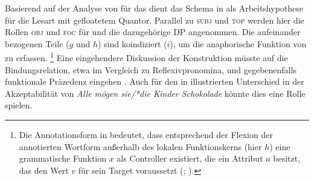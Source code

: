 Basierend auf der Analyse von \citet{spector2009} für das  dient das
Schema in  als Arbeits\-hypothese für die Lesart
mit gefloatetem Quantor. Parallel zu \textsc{subj} und \textsc{top} werden hier
die Rollen \textsc{obj} und \textsc{foc} für  und die dazugehörige
DP angenommen. Die aufeinander bezogenen Teile ($g$ und $h$) sind koindiziert
($i$), um die anaphorische Funktion von  zu erfassen.%
%
	\footnote{Die Annotationsform  in
		 bedeutet, dass entsprechend der Flexion der
		annotierten Wortform außerhalb des lokalen Funktionskerns (hier $h$)
		eine grammatische Funktion $x$ als Controller existiert, die ein
		Attribut $a$ besitzt, das den Wert $v$ für sein Target voraussetzt
		(;
		\cite[66--70]{bresnanetal2016}).}
%
Eine eingehendere Diskussion der Konstruktion müsste auf die Bindungsrelation,
etwa im Vergleich zu Reflexivpronomina, und gegebenenfalls funktionale
Präzedenz eingehen \autocite[vgl.][213, 254--285]{bresnanetal2016}. Auch für
den in  illustrierten Unterschied in der Akzeptabilität
von \textit{Alle mögen sie/*die Kinder Schokolade} könnte dies eine Rolle
spielen.


